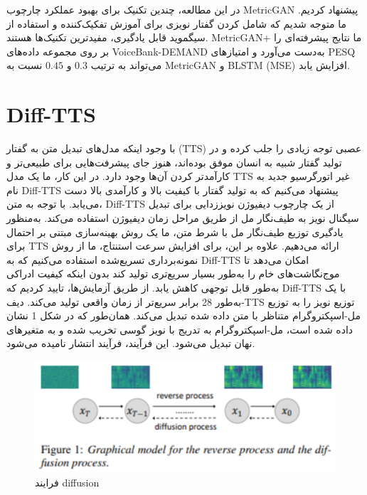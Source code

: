 \documentclass[fleqn]{report}
\begin{document}
در این مطالعه، چندین تکنیک برای بهبود عملکرد چارچوب MetricGAN پیشنهاد کردیم. ما متوجه شدیم که شامل کردن گفتار نویزی برای آموزش تفکیک‌کننده و استفاده از سیگموید قابل یادگیری، مفیدترین تکنیک‌ها هستند. MetricGAN+ ما نتایج پیشرفته‌ای را بر روی مجموعه داده‌های VoiceBank-DEMAND به‌دست می‌آورد و امتیازهای PESQ می‌تواند به ترتیب $0.3$ و $0.45$ نسبت به MetricGAN و BLSTM (MSE) افزایش یابد.

\section{Diff-TTS}
با وجود اینکه مدل‌های تبدیل متن به گفتار (TTS) عصبی توجه زیادی را جلب کرده و در تولید گفتار شبیه به انسان موفق بوده‌اند، هنوز جای پیشرفت‌هایی برای طبیعی‌تر و کارآمدتر کردن آن‌ها وجود دارد. در این کار، ما یک مدل TTS غیر اتورگرسیو جدید به نام Diff-TTS پیشنهاد می‌کنیم که به تولید گفتار با کیفیت بالا و کارآمدی بالا دست می‌یابد. با توجه به متن، Diff-TTS از یک چارچوب دیفیوژن نویززدایی برای تبدیل سیگنال نویز به طیف‌نگار مل از طریق مراحل زمان دیفیوژن استفاده می‌کند. به‌منظور یادگیری توزیع طیف‌نگار مل با شرط متن، ما یک روش بهینه‌سازی مبتنی بر احتمال برای TTS ارائه می‌دهیم. علاوه بر این، برای افزایش سرعت استنتاج، ما از روش نمونه‌برداری تسریع‌شده استفاده می‌کنیم که به Diff-TTS امکان می‌دهد تا موج‌نگاشت‌های خام را به‌طور بسیار سریع‌تری تولید کند بدون اینکه کیفیت ادراکی به‌طور قابل توجهی کاهش یابد. از طریق آزمایش‌ها، تایید کردیم که Diff-TTS با یک  به‌طور 28 برابر سریع‌تر از زمان واقعی تولید می‌کند.
دیف-TTS توزیع نویز را به توزیع مل-اسپکتروگرام متناظر با متن داده شده تبدیل می‌کند. همان‌طور که در شکل 1 نشان داده شده است، مل-اسپکتروگرام به تدریج با نویز گوسی تخریب شده و به متغیرهای نهان تبدیل می‌شود. این فرآیند، فرآیند انتشار نامیده می‌شود.

\begin{figure}[h]

    \centering
    \includegraphics[width=.8\textwidth, keepaspectratio]{images/diffusion.jpg}
    
    \caption{فرایند diffusion}
    \label{fig:diffusion}
\end{figure}
\end{document}
